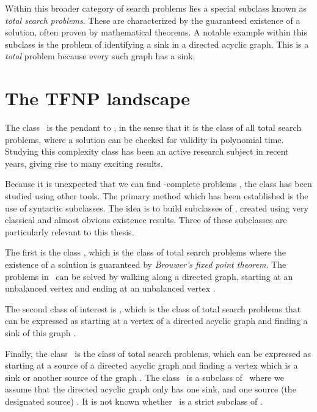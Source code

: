 Within this broader category of search problems lies a special subclass known as \emph{total search problems}. These are characterized by the guaranteed existence of a solution, often proven by mathematical theorems. A notable example within this subclass is the problem of identifying a sink in a directed acyclic graph. This is a \textit{total} problem because every such graph has a sink.

\section{The TFNP landscape}

The class \TFNP\ is the pendant to \NP, in the sense that it is the class of all total search problems, where a solution can be checked for validity in polynomial time. Studying this complexity class has been an active research subject in recent years, giving rise to many exciting results.

Because it is unexpected that we can find \TFNP-complete problems , the class has been studied using other tools. The primary method which has been established is the use of syntactic subclasses. The idea is to build subclasses of \TFNP, created using very classical and almost obvious existence results. Three of these subclasses are particularly relevant to this thesis.

The first is the class \PPAD, which is the class of total search problems where the existence of a solution is guaranteed by \textit{Brouwer's fixed point theorem}. The problems in \PPAD\ can be solved by walking along a directed graph, starting at an unbalanced vertex and ending at an unbalanced vertex .

The second class of interest is \PLS, which is the class of total search problems that can be expressed as starting at a vertex of a directed acyclic graph and finding a sink of this graph .

Finally, the class \EOPL\ is the class of total search problems, which can be expressed as starting at a source of a directed acyclic graph and finding a vertex which is a sink or another source of the graph . The class \UEOPL\ is a subclass of \EOPL\ where we assume that the directed acyclic graph only has one sink, and one source (the designated source) . It is not known whether \UEOPL\ is a strict subclass of \EOPL.

